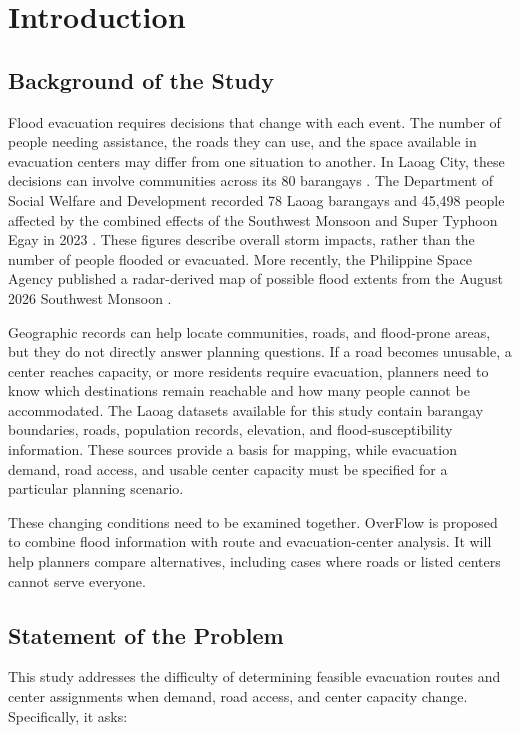 \section{Introduction}
\label{Introduction}

\subsection{Background of the Study}

Flood evacuation requires decisions that change with each event. The number of people needing assistance, the roads they can use, and the space available in evacuation centers may differ from one situation to another. In Laoag City, these decisions can involve communities across its 80 barangays \cite{psalaoag}. The Department of Social Welfare and Development recorded 78 Laoag barangays and 45,498 people affected by the combined effects of the Southwest Monsoon and Super Typhoon Egay in 2023 \cite{dswdegay2023}. These figures describe overall storm impacts, rather than the number of people flooded or evacuated. More recently, the Philippine Space Agency published a radar-derived map of possible flood extents from the August 2026 Southwest Monsoon \cite{philsa2026flood}.

Geographic records can help locate communities, roads, and flood-prone areas, but they do not directly answer planning questions. If a road becomes unusable, a center reaches capacity, or more residents require evacuation, planners need to know which destinations remain reachable and how many people cannot be accommodated. The Laoag datasets available for this study contain barangay boundaries, roads, population records, elevation, and flood-susceptibility information. These sources provide a basis for mapping, while evacuation demand, road access, and usable center capacity must be specified for a particular planning scenario.

These changing conditions need to be examined together. OverFlow is proposed to combine flood information with route and evacuation-center analysis. It will help planners compare alternatives, including cases where roads or listed centers cannot serve everyone.

\subsection{Statement of the Problem}

This study addresses the difficulty of determining feasible evacuation routes and center assignments when demand, road access, and center capacity change. Specifically, it asks:

